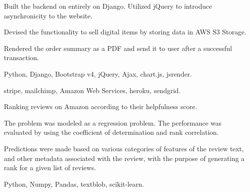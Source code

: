 \begin{tightemize}
\item Built the backend on entirely on Django. Utilized jQuery to introduce asynchronicity to the website.
\item Devised the functionality to sell digital items by storing data in AWS S3 Storage.
\item Rendered the order summary as a PDF and send it to user after a successful transaction.
\item {} Python, Django, Bootstrap v4, jQuery, Ajax, chart.js, jsrender.
\item {} stripe, mailchimp, Amazon Web Services, heroku, sendgrid.
\end{tightemize}
\sectionsep

\begin{tightemize}
\item Ranking reviews on Amazon according to their helpfulness score.
\item The problem was modeled as a regression problem. The performance was evaluated by using the coefficient of determination and rank correlation.
\item Predictions were made based on various categories of features of the review text, and other metadata associated with the review, with the purpose of generating a rank for a given list of reviews.
\item {} Python, Numpy, Pandas, textblob, scikit-learn.
\end{tightemize}
\sectionsep

